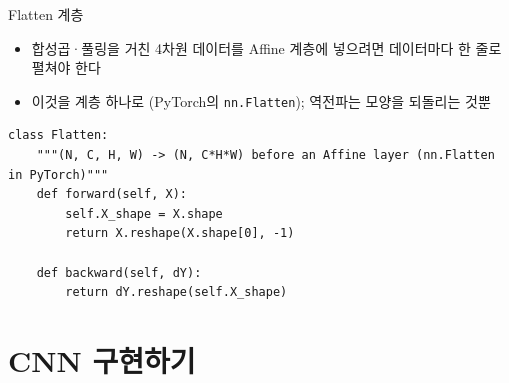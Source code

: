 \documentclass[aspectratio=169,11pt]{beamer}
\begin{document}
\begin{frame}[fragile]{Flatten 계층}
\begin{itemize}
\item 합성곱·풀링을 거친 4차원 데이터를 Affine 계층에 넣으려면 데이터마다 한 줄로 펼쳐야 한다
\item 이것을 계층 하나로 (PyTorch의 \texttt{nn.Flatten}); 역전파는 모양을 되돌리는 것뿐
\end{itemize}
\begin{lstlisting}
class Flatten:
    """(N, C, H, W) -> (N, C*H*W) before an Affine layer (nn.Flatten in PyTorch)"""
    def forward(self, X):
        self.X_shape = X.shape
        return X.reshape(X.shape[0], -1)

    def backward(self, dY):
        return dY.reshape(self.X_shape)
\end{lstlisting}
\end{frame}

\section{CNN 구현하기}
\end{document}
